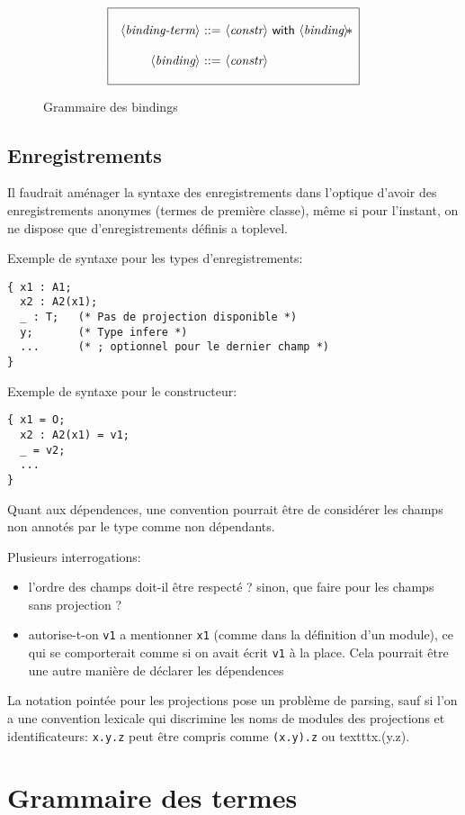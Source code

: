 \documentclass{article}
\makeatletter
\def\NT#1{\langle\textit{#1}\rangle}
\def\TERM#1{\textsf{#1}}
\def\STAR#1{#1\!*}
\newenvironment{cadre}
        {\begin{array}{|c|}\hline\\}
        {\\\\\hline\end{array}}
\newenvironment{rulebox}
        {$$\begin{cadre}\begin{array}{r@{~}c@{~}l@{}r}}
        {\end{array}\end{cadre}$$}
\def\DEFNT#1{\NT{#1} & ::= &}
\def\SEPDEF{\\\\}
\makeatother
\begin{document}
\begin{figure}
\begin{rulebox}
\DEFNT{binding-term}
       \NT{constr} ~\TERM{with} ~\STAR{\NT{binding}}
\SEPDEF
\DEFNT{binding}
       \NT{constr}
\end{rulebox}
\caption{Grammaire des bindings}
\label{bindings}
\end{figure}

\subsection{Enregistrements}

Il faudrait aménager la syntaxe des enregistrements dans l'optique
d'avoir des enregistrements anonymes (termes de première classe), même
si pour l'instant, on ne dispose que d'enregistrements définis a
toplevel.

Exemple de syntaxe pour les types d'enregistrements:
\begin{verbatim}
{ x1 : A1;
  x2 : A2(x1);
  _ : T;   (* Pas de projection disponible *)
  y;       (* Type infere *)
  ...      (* ; optionnel pour le dernier champ *)
}
\end{verbatim}

Exemple de syntaxe pour le constructeur:
\begin{verbatim}
{ x1 = O;
  x2 : A2(x1) = v1;
  _ = v2;
  ...
}
\end{verbatim}
Quant aux dépendences, une convention pourrait être de considérer les
champs non annotés par le type comme non dépendants.

Plusieurs interrogations:
\begin{itemize}
\item l'ordre des champs doit-il être respecté ?
  sinon, que faire pour les champs sans projection ?
\item autorise-t-on \texttt{v1} a mentionner \texttt{x1} (comme dans
  la définition d'un module), ce qui se comporterait comme si on avait
  écrit \texttt{v1} à la place. Cela pourrait être une autre manière
  de déclarer les dépendences
\end{itemize}

La notation pointée pour les projections pose un problème de parsing,
sauf si l'on a une convention lexicale qui discrimine les noms de
modules des projections et identificateurs: \texttt{x.y.z} peut être
compris comme \texttt{(x.y).z} ou texttt{x.(y.z)}.


\section{Grammaire des termes}
\label{constrsyntax}
\end{document}
